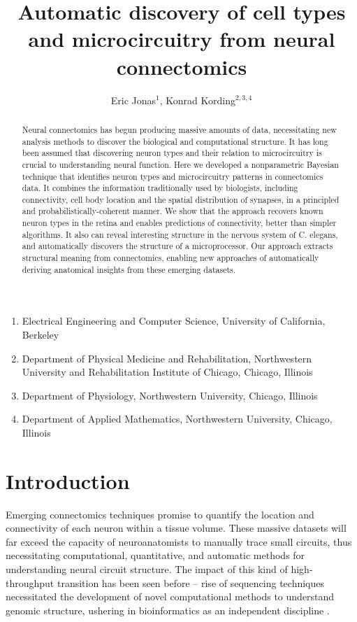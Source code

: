 \documentclass{article}
\title{Automatic discovery of cell types and microcircuitry from neural connectomics}
\author{Eric Jonas$^1$, Konrad Kording$^{2, 3,4}$}
\begin{document}
\maketitle

\begin{small}
\begin{enumerate}
  \item Electrical Engineering and Computer Science, University of California, Berkeley
  \item Department of Physical Medicine and Rehabilitation,
    Northwestern University and Rehabilitation Institute of Chicago,
    Chicago, Illinois
  \item Department of Physiology, Northwestern University, Chicago, Illinois
  \item Department of Applied Mathematics, Northwestern University, Chicago, Illinois
\end{enumerate}
\end{small}

\begin{abstract}
  Neural connectomics has begun producing massive amounts of data,
  necessitating new analysis methods to discover the biological and
  computational structure. It has long been assumed that discovering
  neuron types and their relation to microcircuitry is crucial to
  understanding neural function. Here we developed a nonparametric
  Bayesian technique that identifies neuron types and microcircuitry
  patterns in connectomics data. It combines the information
  traditionally used by biologists, including connectivity, cell body
  location and the spatial distribution of synapses, in a
  principled and probabilistically-coherent manner. We show that the
  approach recovers known neuron types in the retina and enables
  predictions of connectivity, better than simpler algorithms. It also
  can reveal interesting structure in the nervous system of
  C. elegans, and automatically discovers the structure of a
  microprocessor.  Our approach extracts structural meaning from
  connectomics, enabling new approaches of automatically deriving
  anatomical insights from these emerging datasets.
\end{abstract}

\section*{Introduction}
Emerging connectomics techniques \autocite{Morgan2013,Zador2012}
promise to quantify the location and connectivity of each neuron
within a tissue volume. These massive datasets will far exceed the
capacity of neuroanatomists to manually trace small circuits, thus
necessitating computational, quantitative, and automatic methods for
understanding neural circuit structure.  The impact of this kind of
high-throughput transition has been seen before -- rise of sequencing
techniques necessitated the development of novel computational methods
to understand genomic structure, ushering in  bioinformatics
as an independent discipline \autocite{Koboldt2013}.
\end{document}
